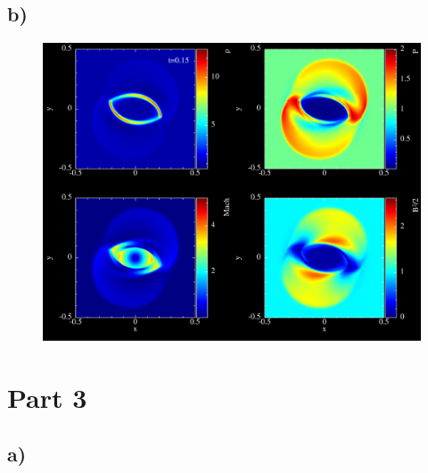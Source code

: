 \documentclass{article}
\begin{document}
\subsection*{b)}
\begin{figure}[h]
    \centering
    \includegraphics[width=\linewidth]{2b.pdf}
    \caption{}
    \label{2b}
\end{figure}

\section*{Part 3}
\subsection*{a)}
\end{document}
